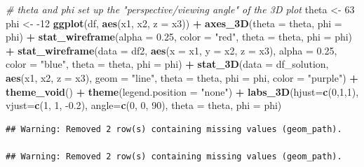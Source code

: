 \documentclass[
]{book}
\newenvironment{Shaded}{\begin{snugshade}}{\end{snugshade}}
\newcommand{\CommentTok}[1]{\textcolor[rgb]{0.56,0.35,0.01}{\textit{#1}}}
\newcommand{\DataTypeTok}[1]{\textcolor[rgb]{0.13,0.29,0.53}{#1}}
\newcommand{\DecValTok}[1]{\textcolor[rgb]{0.00,0.00,0.81}{#1}}
\newcommand{\FloatTok}[1]{\textcolor[rgb]{0.00,0.00,0.81}{#1}}
\newcommand{\KeywordTok}[1]{\textcolor[rgb]{0.13,0.29,0.53}{\textbf{#1}}}
\newcommand{\NormalTok}[1]{#1}
\newcommand{\OperatorTok}[1]{\textcolor[rgb]{0.81,0.36,0.00}{\textbf{#1}}}
\newcommand{\StringTok}[1]{\textcolor[rgb]{0.31,0.60,0.02}{#1}}
\theoremstyle{definition}
\theoremstyle{definition}
\theoremstyle{definition}
\theoremstyle{remark}
\begin{document}
\begin{Shaded}
\begin{Highlighting}[]
\CommentTok{# theta and phi set up the "perspective/viewing angle" of the 3D plot}
\NormalTok{theta <-}\StringTok{ }\DecValTok{63}
\NormalTok{phi <-}\StringTok{ }\DecValTok{-12}
\KeywordTok{ggplot}\NormalTok{(df, }\KeywordTok{aes}\NormalTok{(x1, x2, }\DataTypeTok{z =}\NormalTok{ x3)) }\OperatorTok{+}
\StringTok{    }\KeywordTok{axes_3D}\NormalTok{(}\DataTypeTok{theta =}\NormalTok{ theta, }\DataTypeTok{phi =}\NormalTok{ phi) }\OperatorTok{+}
\StringTok{    }\KeywordTok{stat_wireframe}\NormalTok{(}\DataTypeTok{alpha =} \FloatTok{0.25}\NormalTok{, }\DataTypeTok{color =} \StringTok{"red"}\NormalTok{, }\DataTypeTok{theta =}\NormalTok{ theta, }\DataTypeTok{phi =}\NormalTok{ phi) }\OperatorTok{+}
\StringTok{    }\KeywordTok{stat_wireframe}\NormalTok{(}\DataTypeTok{data =}\NormalTok{ df2, }\KeywordTok{aes}\NormalTok{(}\DataTypeTok{x =}\NormalTok{ x1, }\DataTypeTok{y =}\NormalTok{ x2, }\DataTypeTok{z =}\NormalTok{ x3), }\DataTypeTok{alpha =} \FloatTok{0.25}\NormalTok{, }\DataTypeTok{color =} \StringTok{"blue"}\NormalTok{, }\DataTypeTok{theta =}\NormalTok{ theta, }\DataTypeTok{phi =}\NormalTok{ phi) }\OperatorTok{+}
\StringTok{    }\KeywordTok{stat_3D}\NormalTok{(}\DataTypeTok{data =}\NormalTok{ df_solution, }\KeywordTok{aes}\NormalTok{(x1, x2, }\DataTypeTok{z =}\NormalTok{ x3), }\DataTypeTok{geom =} \StringTok{"line"}\NormalTok{, }\DataTypeTok{theta =}\NormalTok{ theta, }\DataTypeTok{phi =}\NormalTok{ phi, }\DataTypeTok{color =} \StringTok{"purple"}\NormalTok{) }\OperatorTok{+}
\StringTok{    }\KeywordTok{theme_void}\NormalTok{() }\OperatorTok{+}
\StringTok{    }\KeywordTok{theme}\NormalTok{(}\DataTypeTok{legend.position =} \StringTok{"none"}\NormalTok{) }\OperatorTok{+}
\StringTok{    }\KeywordTok{labs_3D}\NormalTok{(}\DataTypeTok{hjust=}\KeywordTok{c}\NormalTok{(}\DecValTok{0}\NormalTok{,}\DecValTok{1}\NormalTok{,}\DecValTok{1}\NormalTok{), }\DataTypeTok{vjust=}\KeywordTok{c}\NormalTok{(}\DecValTok{1}\NormalTok{, }\DecValTok{1}\NormalTok{, }\FloatTok{-0.2}\NormalTok{), }\DataTypeTok{angle=}\KeywordTok{c}\NormalTok{(}\DecValTok{0}\NormalTok{, }\DecValTok{0}\NormalTok{, }\DecValTok{90}\NormalTok{), }\DataTypeTok{theta =}\NormalTok{ theta, }\DataTypeTok{phi =}\NormalTok{ phi) }
\end{Highlighting}
\end{Shaded}

\begin{verbatim}
## Warning: Removed 2 row(s) containing missing values (geom_path).

## Warning: Removed 2 row(s) containing missing values (geom_path).
\end{verbatim}
\end{document}
